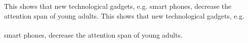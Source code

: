 This shows that new technological gadgets, e.g. smart phones, decrease the attention span of young adults. %
This shows that new technological gadgets, e.g.\\\\ smart phones, decrease the attention span of young adults. %